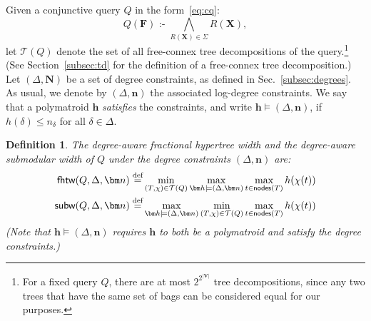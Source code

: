 \documentclass[10pt,a4paper]{article}
\newtheorem{definition}{Definition}[section]
\newcommand{\calT}{\mathcal T}
\newcommand{\defeq}{\stackrel{\text{def}}{=}}
\newcommand{\cd}{\text{ :- }}
\newcommand{\nodes}{\text{\sf nodes}}
\newcommand{\fhtw}{\textsf{fhtw}}
\newcommand{\subm}{\textsf{subw}}
\begin{document}
Given a conjunctive query $Q$ in the form~\eqref{eq:cq}:
\[ Q(\bm F) \cd  \bigwedge_{R(\bm X)\in \Sigma}R(\bm X), \]
let $\calT(Q)$ denote the set of all free-connex tree decompositions of the query.\footnote{
For a fixed query $Q$, there are at most $2^{2^{|\bm V|}}$ tree decompositions,
since any two trees that have the same set of bags can be considered
equal for our purposes.}
(See Section~\ref{subsec:td} for the definition of a free-connex tree decomposition.)
Let $(\Delta,\bm N)$ be a set of degree constraints, as defined in
Sec.~\ref{subsec:degrees}. As usual, we denote by $(\Delta, \bm n)$
the associated log-degree constraints.  We say that a polymatroid
$\bm h$ {\em satisfies} the constraints, and write
$\bm h \models (\Delta, \bm n)$, if $h(\delta) \leq n_\delta$ for all
$\delta \in \Delta$.

\begin{definition} \label{def:subw} The {\em degree-aware fractional
    hypertree width} and the {\em degree-aware submodular width} of
  $Q$ under the degree constraints $(\Delta, \bm n)$ are:
  \begin{align}
    \fhtw(Q,\Delta,\bm n) \defeq & \min_{(T,\chi)\in \calT(Q)} \max_{\bm h\models(\Delta,\bm n)} \max_{t \in \nodes(T)}h(\chi(t)) \label{eq:fhtw} \\
    \subm(Q,\Delta,\bm n) \defeq & \max_{\bm h\models(\Delta,\bm n)} \min_{(T,\chi)\in \calT(Q)} \max_{t \in \nodes(T)}h(\chi(t)) \label{eq:subm}
  \end{align}
(Note that $\bm h \models (\Delta,\bm n)$ requires $\bm h$ to both be a polymatroid
and satisfy the degree constraints.)
\end{definition}
%
\end{document}

